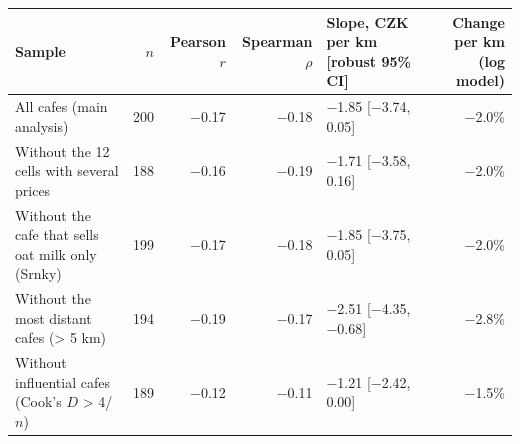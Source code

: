 \begin{tabular}{p{5.2cm}rrrp{3.4cm}r}
  \toprule
Sample & $n$ & Pearson $r$ & Spearman $\rho$ & Slope, CZK per km [robust 95\% CI] & Change per km (log model) \\ 
  \midrule
All cafes (main analysis) & 200 & $-$0.17 & $-$0.18 & $-$1.85 [$-$3.74, 0.05] & $-$2.0\% \\ 
  Without the 12 cells with several prices & 188 & $-$0.16 & $-$0.19 & $-$1.71 [$-$3.58, 0.16] & $-$2.0\% \\ 
  Without the cafe that sells oat milk only (Srnky) & 199 & $-$0.17 & $-$0.18 & $-$1.85 [$-$3.75, 0.05] & $-$2.0\% \\ 
  Without the most distant cafes (> 5 km) & 194 & $-$0.19 & $-$0.17 & $-$2.51 [$-$4.35, $-$0.68] & $-$2.8\% \\ 
  Without influential cafes (Cook's $D$ > 4/$n$) & 189 & $-$0.12 & $-$0.11 & $-$1.21 [$-$2.42, 0.00] & $-$1.5\% \\ 
   \bottomrule
\end{tabular}
